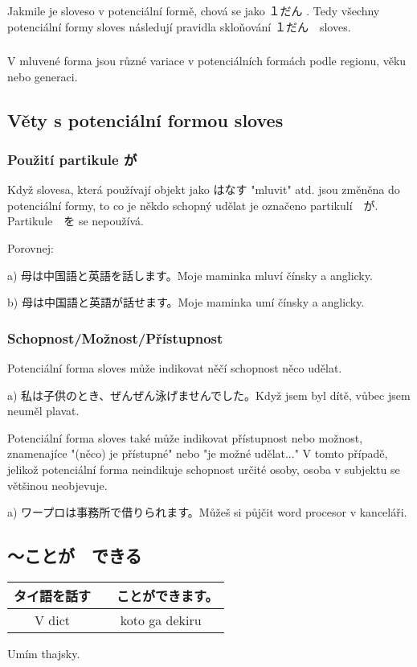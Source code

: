 \subsubsection{} Jakmile je sloveso v potenciální formě, chová se jako １だん	. Tedy všechny potenciální formy sloves následují pravidla skloňování 	１だん　sloves.
\subsubsection{} V mluvené forma jsou různé variace v potenciálních formách podle regionu, věku nebo generaci. 

\subsection{Věty s potenciální formou sloves}
\subsubsection{Použití partikule が}

Když slovesa, která používají objekt jako はなす "mluvit" atd. jsou změněna do potenciální formy, to co je někdo schopný udělat je označeno partikulí　が. Partikule　を se nepoužívá.

Porovnej:

a) 母は中国語と英語を話します。Moje maminka mluví čínsky a anglicky.

b) 母は中国語と英語が話せます。Moje maminka umí čínsky a anglicky.

\subsubsection{Schopnost/Možnost/Přístupnost}
Potenciální forma sloves může indikovat něčí schopnost něco udělat.

a) 私は子供のとき、ぜんぜん泳げませんでした。Když jsem byl dítě, vůbec jsem neuměl plavat.

Potenciální forma sloves také může indikovat přístupnost nebo možnost, znamenajíce "(něco) je přístupné" nebo "je možné udělat..." V tomto případě, jelikož potenciální forma neindikuje schopnost určité osoby, osoba v subjektu se většinou neobjevuje.

a) ワープロは事務所で借りられます。Můžeš si půjčit word procesor v kanceláři.


\subsection{〜ことが　できる}
\begin{center}
\begin{tabular}{||c|c||}
\hline
タイ語を話す&　ことができます。\\
\hline
V dict & koto ga dekiru\\
\hline
\end{tabular}
\end{center}
Umím thajsky.

